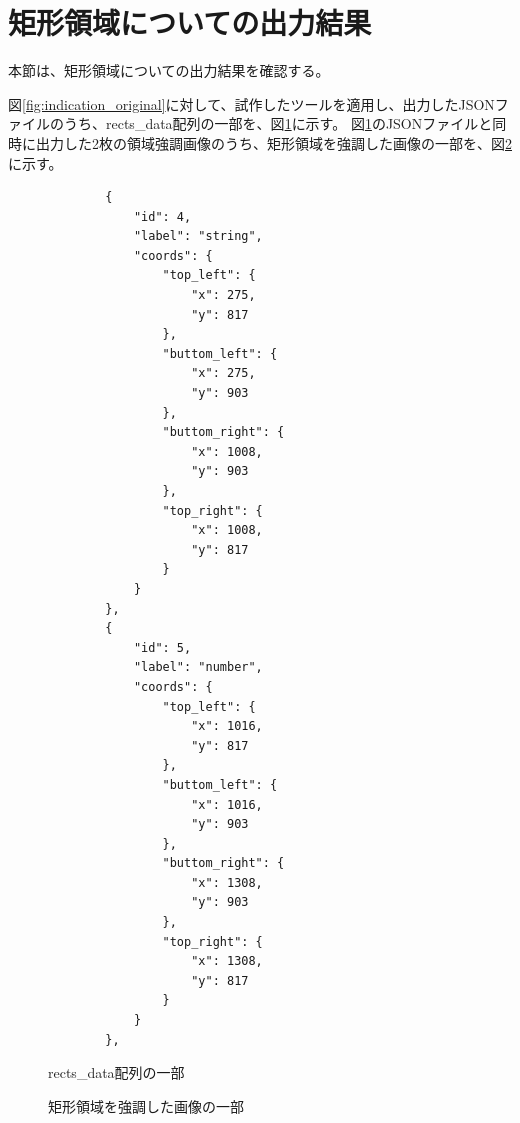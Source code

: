 \section{矩形領域についての出力結果}\label{sec:result_rect}
本節は、矩形領域についての出力結果を確認する。

図\ref{fig:indication_original}に対して、試作したツールを適用し、出力したJSONファイルのうち、rects\_data配列の一部を、図\ref{fig:rects_data_json}に示す。
図\ref{fig:rects_data_json}のJSONファイルと同時に出力した2枚の領域強調画像のうち、矩形領域を強調した画像の一部を、図\ref{fig:highlighted_rects_part}に示す。

\lstset{language=}
\begin{figure}[t]
    \begin{lstlisting}
        {
            "id": 4,
            "label": "string",
            "coords": {
                "top_left": {
                    "x": 275,
                    "y": 817
                },
                "buttom_left": {
                    "x": 275,
                    "y": 903
                },
                "buttom_right": {
                    "x": 1008,
                    "y": 903
                },
                "top_right": {
                    "x": 1008,
                    "y": 817
                }
            }
        },
        {
            "id": 5,
            "label": "number",
            "coords": {
                "top_left": {
                    "x": 1016,
                    "y": 817
                },
                "buttom_left": {
                    "x": 1016,
                    "y": 903
                },
                "buttom_right": {
                    "x": 1308,
                    "y": 903
                },
                "top_right": {
                    "x": 1308,
                    "y": 817
                }
            }
        },
    \end{lstlisting}
    \caption{rects\_data配列の一部}\label{fig:rects_data_json}
\end{figure}

\begin{figure}[tp]
    \begin{center}
        \caption{矩形領域を強調した画像の一部}
        \label{fig:highlighted_rects_part}
    \end{center}
\end{figure}

